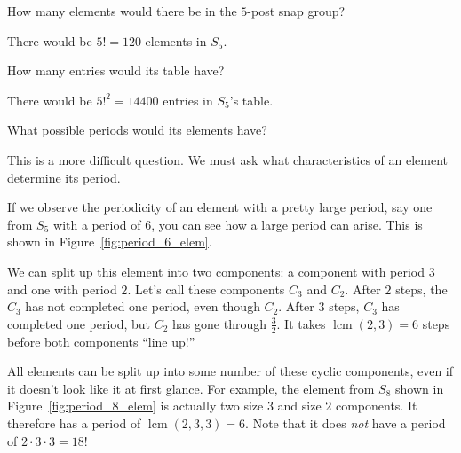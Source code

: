 \documentclass[../gatm_answers.tex]{subfiles}
\begin{document}
\begin{outer_problem}
	\item 
\end{outer_problem}

\begin{inner_problem}[start=1]
	 \item How many elements would there be in the $5$-post snap group? \label{prob:five_post_snap_list_start}
\end{inner_problem}

\noindent There would be $5!=120$ elements in $S_5$.

\begin{inner_problem}
	\item How many entries would its table have?
\end{inner_problem}

\noindent There would be $5!^2=14400$ entries in $S_5$'s table.

\begin{inner_problem}
	\item What possible periods would its elements have? \label{prob:five_post_snap_list_end}
\end{inner_problem}

\noindent This is a more difficult question. We must ask what characteristics of an element determine its period.

If we observe the periodicity of an element with a pretty large period, say one from $S_5$ with a period of $6$, you can see how a large period can arise. This is shown in Figure~\ref{fig:period_6_elem}.

We can split up this element into two components: a component with period $3$ and one with period $2$. Let's call these components $C_3$ and $C_2$. After $2$ steps, the $C_3$ has not completed one period, even though $C_2$. After $3$ steps, $C_3$ has completed one period, but $C_2$ has gone through $\frac{3}{2}$. It takes $\operatorname{lcm}(2,3) = 6$ steps before both components ``line up!''

All elements can be split up into some number of these cyclic components, even if it doesn't look like it at first glance. For example, the element from $S_8$ shown in Figure~\ref{fig:period_8_elem} is actually two size $3$ and size $2$ components. It therefore has a period of $\operatorname{lcm}(2,3,3)=6$. Note that it does \textit{not} have a period of $2\cdot 3\cdot 3 = 18$!
\end{document}
